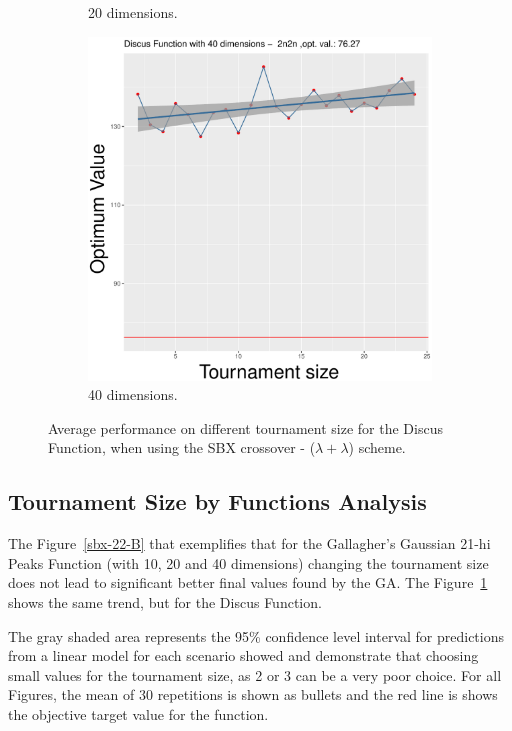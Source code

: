 \begin{figure}[t]
\begin{subfigure}[b]{0.33\textwidth}
		\caption{20 dimensions.}
	\end{subfigure}
	\begin{subfigure}[b]{0.33\textwidth}
		\centering
		\includegraphics[width=\textwidth]{img/2n2n-40D/unimodal_2n2n_11_dim_40.pdf}
		\caption{40 dimensions.}
	\end{subfigure}
	\caption{Average performance on different tournament size for the Discus Function, when using the SBX crossover - ($\lambda + \lambda$) scheme.}
	\label{sbx-11-B}
\end{figure}


\subsection{Tournament Size by Functions Analysis}
The Figure~\ref{sbx-22-B} that exemplifies that for the Gallagher's Gaussian 21-hi Peaks Function (with 10, 20 and 40 dimensions) changing the tournament size does not lead to significant better final values found by the GA. The Figure~\ref{sbx-11-B} shows the same trend, but for the Discus Function.

The gray shaded area represents the 95\% confidence level interval for predictions from a linear model for each scenario showed and demonstrate that choosing small values for the tournament size, as 2 or 3 can be a very poor choice. For all Figures, the mean of 30 repetitions is shown as bullets and the red line is shows the objective target value for the function.


